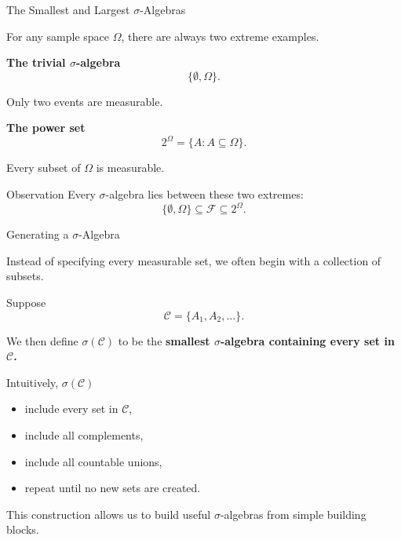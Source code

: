 \documentclass [aspectratio=169]{beamer}
\begin{document}
\begin{frame}{The Smallest and Largest $\sigma$-Algebras}

For any sample space $\Omega$, there are always two extreme examples.

\vspace{3mm}

\textbf{The trivial $\sigma$-algebra}
\[
\{
\emptyset,\Omega
\}.
\]

Only two events are measurable.

\vspace{5mm}

\textbf{The power set}
\[
2^\Omega
=
\{
A:A\subseteq\Omega
\}.
\]

Every subset of $\Omega$ is measurable.

\vspace{5mm}

\begin{block}{Observation}
Every $\sigma$-algebra lies between these two extremes:
\[
\{\emptyset,\Omega\}
\subseteq
\mathcal F
\subseteq
2^\Omega.
\]
\end{block}

\end{frame}

\begin{frame}{Generating a $\sigma$-Algebra}

Instead of specifying every measurable set, we often begin with a collection of subsets.

Suppose
\[
\mathcal C
=
\{
A_1,A_2,\ldots
\}.
\]

\vspace{3mm}

We then define $\sigma(\mathcal C)$ to be the \textbf{smallest $\sigma$-algebra containing every set in $\mathcal C$.}

\vspace{3mm}

Intuitively, $\sigma(\mathcal C)$

\begin{itemize}
\item include every set in $\mathcal C$,
\item include all complements,
\item include all countable unions,
\item repeat until no new sets are created.
\end{itemize}

\vspace{3mm}

This construction allows us to build useful $\sigma$-algebras from simple building blocks.

\end{frame}
\end{document}
